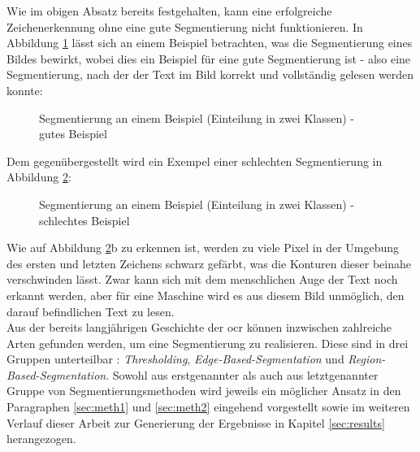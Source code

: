 		Wie im obigen Absatz bereits festgehalten, kann eine erfolgreiche Zeichenerkennung ohne eine gute Segmentierung nicht funktionieren. In Abbildung \ref{fig:seg-example-good} lässt sich an einem Beispiel betrachten, was die Segmentierung eines Bildes bewirkt, wobei dies ein Beispiel für eine gute Segmentierung ist - also eine Segmentierung, nach der der Text im Bild korrekt und vollständig gelesen werden konnte:
		\begin{figure}[H]
			\centering
			\qquad
			\caption{Segmentierung an einem Beispiel (Einteilung in zwei Klassen) - gutes Beispiel}
			\label{fig:seg-example-good}
		\end{figure}
		Dem gegenübergestellt wird ein Exempel einer schlechten Segmentierung in Abbildung \ref{fig:seg-example-bad}:
		\begin{figure}[H]
			\centering
			\qquad
			\caption{Segmentierung an einem Beispiel (Einteilung in zwei Klassen) - schlechtes Beispiel}
			\label{fig:seg-example-bad}
		\end{figure}
		Wie auf Abbildung \ref{fig:seg-example-bad}b zu erkennen ist, werden zu viele Pixel in der Umgebung des ersten und letzten Zeichens schwarz gefärbt, was die Konturen dieser beinahe verschwinden lässt. Zwar kann sich mit dem menschlichen Auge der Text noch erkannt werden, aber für eine Maschine wird es aus diesem Bild unmöglich, den darauf befindlichen Text zu lesen.\\
		Aus der bereits langjährigen Geschichte der \gls{ocr} können inzwischen zahlreiche Arten gefunden werden, um eine Segmentierung zu realisieren. Diese sind in drei Gruppen unterteilbar \cite[Kapitel 10]{gonzalez-woods}: \textit{Thresholding}, \textit{Edge-Based-Segmentation} und \textit{Region-Based-Segmentation}. Sowohl aus erstgenannter als auch aus letztgenannter Gruppe von Segmentierungsmethoden wird jeweils ein möglicher Ansatz in den Paragraphen \ref{sec:meth1} und \ref{sec:meth2} eingehend vorgestellt sowie im weiteren Verlauf dieser Arbeit zur Generierung der Ergebnisse in Kapitel \ref{sec:results} herangezogen. \\
		

